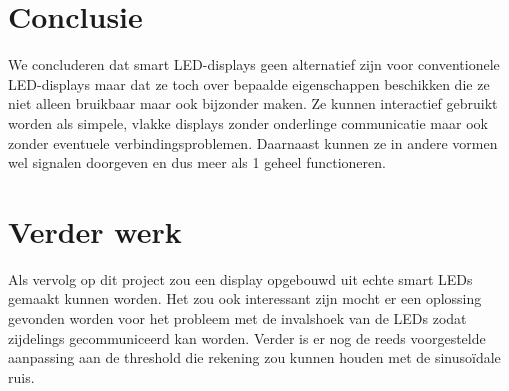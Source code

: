 \documentclass{article}
\begin{document}
\section{Conclusie}
We concluderen dat smart LED-displays geen alternatief zijn voor conventionele LED-displays maar dat ze toch over bepaalde eigenschappen beschikken die ze niet alleen bruikbaar maar ook bijzonder maken. Ze kunnen interactief gebruikt worden als simpele, vlakke displays zonder onderlinge communicatie maar ook zonder eventuele verbindingsproblemen. Daarnaast kunnen ze in andere vormen wel signalen doorgeven en dus meer als 1 geheel functioneren.


\section{Verder werk}
Als vervolg op dit project zou een display opgebouwd uit echte smart LEDs gemaakt kunnen worden. Het zou ook interessant zijn mocht er een oplossing gevonden worden voor het probleem met de invalshoek van de LEDs zodat zijdelings gecommuniceerd kan worden. Verder is er nog de reeds voorgestelde aanpassing aan de threshold die rekening zou kunnen houden met de sinusoïdale ruis.




\end{document}

